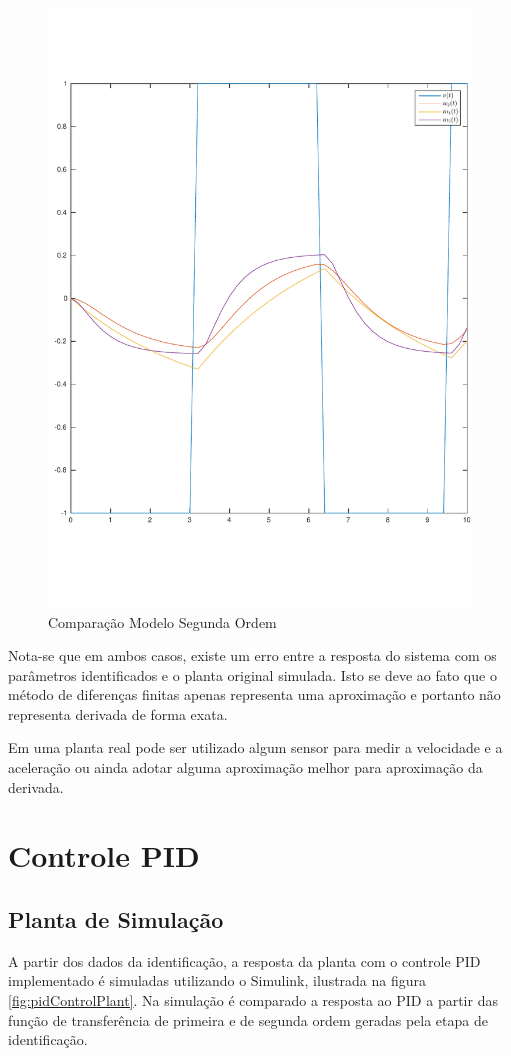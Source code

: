 \documentclass[a4paper,11pt]{article}
\begin{document}
\begin{figure}[H]
    \centering
    \includegraphics[width=0.6\linewidth]{tex/img/model2Evaluation.pdf}
    \caption{Comparação Modelo Segunda Ordem}
    \label{fig:model2Evaluation}
\end{figure}

Nota-se que em ambos casos, existe um erro entre a resposta do sistema com os parâmetros identificados e o planta original simulada. Isto se deve ao fato que o método de diferenças finitas apenas representa uma aproximação e portanto não representa derivada de forma exata.

Em uma planta real pode ser utilizado algum sensor para medir a velocidade e a aceleração ou ainda adotar alguma aproximação melhor para aproximação da derivada.



\section{Controle PID}
\subsection{Planta de Simulação}

A partir dos dados da identificação, a resposta da planta com o controle PID implementado é simuladas utilizando o Simulink, ilustrada na figura \ref{fig:pidControlPlant}. Na simulação é comparado a resposta ao PID a partir das função de transferência de primeira e de segunda ordem geradas pela etapa de identificação.
\end{document}
